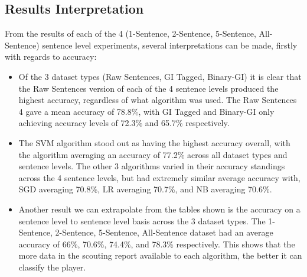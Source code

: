 \documentclass[oneside,12pt]{Classes/RoboticsLaTeX}
\begin{document}
\subsection{Results Interpretation}
From the results of each of the 4 (1-Sentence, 2-Sentence, 5-Sentence, All-Sentence) sentence level experiments, several interpretations can be made, firstly with regards to accuracy:
\begin{itemize}
  \item Of the 3 dataset types (Raw Sentences, GI Tagged, Binary-GI) it is clear that the Raw Sentences version of each of the 4 sentence levels produced the highest accuracy, regardless of what algorithm was used. The Raw
        Sentences 4 gave a mean accuracy of 78.8\%, with GI Tagged and Binary-GI only achieving accuracy levels of 72.3\% and 65.7\% respectively.
  \item The SVM algorithm stood out as having the highest accuracy overall, with the algorithm averaging an accuracy of 77.2\% across all dataset types and sentence levels. The other 3 algorithms varied in their
         accuracy standings across the 4 sentence levels, but had extremely similar average accuracy with, SGD averaging 70.8\%, LR averaging 70.7\%, and NB averaging 70.6\%.
  \item Another result we can extrapolate from the tables shown is the accuracy on a sentence level to sentence level basis across the 3 dataset types. The 1-Sentence, 2-Sentence, 5-Sentence, All-Sentence dataset had an average
        accuracy of 66\%, 70.6\%, 74.4\%, and 78.3\% respectively. This shows that the more data in the scouting report available to each algorithm, the better it can classify the player.
\end{itemize} 
\end{document}
